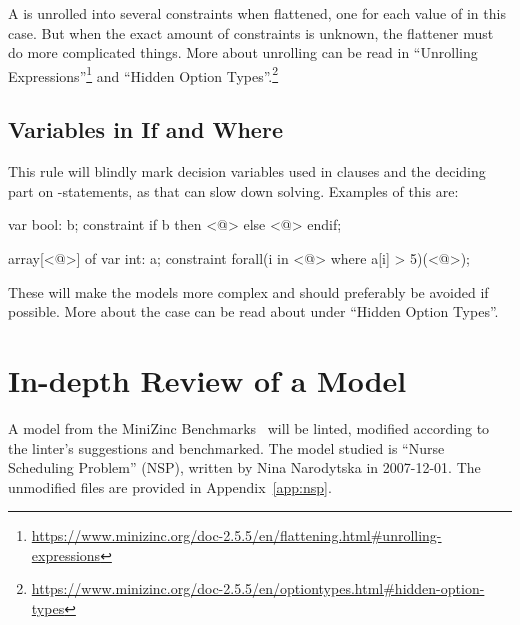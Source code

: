 \documentclass[a4paper,12pt]{article}
\begin{document}
A  is unrolled into several constraints when flattened, one for each
value of  in this case. But when the exact amount of constraints is unknown, the
flattener must do more complicated things. More about unrolling can be read in ``Unrolling
Expressions''\footnote{\url{https://www.minizinc.org/doc-2.5.5/en/flattening.html\#unrolling-expressions}}
and ``Hidden Option Types''.\footnote{\url{https://www.minizinc.org/doc-2.5.5/en/optiontypes.html\#hidden-option-types}}

\subsection{Variables in If and Where}\label{sec:rule:varif}
This rule will blindly mark decision variables used in  clauses and the deciding
part on -statements, as that can slow down solving. Examples of this are:

\begin{mznnobreak}
var bool: b;
constraint if b then <@\dots@> else <@\dots@> endif;
\end{mznnobreak}
\begin{mznnobreak}
array[<@\dots@>] of var int: a;
constraint forall(i in <@\dots@> where a[i] > 5)(<@\dots@>);
\end{mznnobreak}

These will make the models more complex and should preferably be avoided if possible.
More about the  case can be read about under ``Hidden Option
Types''.%

\section{In-depth Review of a Model}\label{sec:nsp}
A model from the MiniZinc Benchmarks~\cite{mznbench} will be linted, modified according to
the linter's suggestions and benchmarked. The model studied is ``Nurse Scheduling
Problem'' (NSP), written by Nina Narodytska in 2007-12-01.
The unmodified files are provided in Appendix~\ref{app:nsp}.
\end{document}
